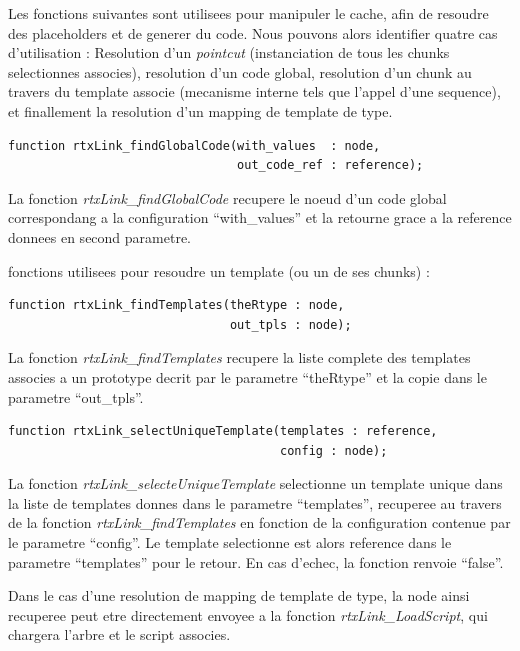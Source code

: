 \documentclass[french]{rtxreport}
\begin{document}
\vspace{20pt}

Les fonctions suivantes sont utilisees pour manipuler le cache, afin de
resoudre des placeholders et de generer du code. Nous pouvons alors identifier
quatre cas d'utilisation : Resolution d'un \emph{pointcut} (instanciation de
tous les chunks selectionnes associes), resolution d'un code global, resolution
d'un chunk au travers du template associe (mecanisme interne tels que l'appel
d'une sequence), et finallement la resolution d'un mapping de template de type.

\begin{lstlisting}
function rtxLink_findGlobalCode(with_values  : node,
                                out_code_ref : reference);
\end{lstlisting}
La fonction \emph{rtxLink\_findGlobalCode} recupere le noeud d'un code global
correspondang a la configuration ``with\_values'' et la retourne grace a la
reference donnees en second parametre.

\vspace{20pt}

fonctions utilisees pour resoudre un template (ou un de ses chunks) :
\begin{lstlisting}
function rtxLink_findTemplates(theRtype : node,
                               out_tpls : node);
\end{lstlisting}
La fonction \emph{rtxLink\_findTemplates} recupere la liste complete des
templates associes a un prototype decrit par le parametre ``theRtype'' et la
copie dans le parametre ``out\_tpls''.

\begin{lstlisting}
function rtxLink_selectUniqueTemplate(templates : reference,
                                      config : node);
\end{lstlisting}
La fonction \emph{rtxLink\_selecteUniqueTemplate} selectionne un template
unique dans la liste de templates donnes dans le parametre ``templates'',
recuperee au travers de la fonction \emph{rtxLink\_findTemplates} en fonction
de la configuration contenue par le parametre ``config''. Le template
selectionne est alors reference dans le parametre ``templates'' pour le retour.
En cas d'echec, la fonction renvoie ``false''.

Dans le cas d'une resolution de mapping de template de type, la node ainsi
recuperee peut etre directement envoyee a la fonction
\emph{rtxLink\_LoadScript}, qui chargera l'arbre et le script associes.
\end{document}
